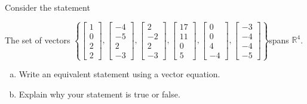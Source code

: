 
\begin{exerciseStatement}


Consider the statement 
\begin{center}\begin{minipage}{0.8\textwidth}
 The set of vectors \( \left\{ \left[\begin{array}{c}
1 \\
0 \\
2 \\
2
\end{array}\right] , \left[\begin{array}{c}
-4 \\
-5 \\
2 \\
-3
\end{array}\right] , \left[\begin{array}{c}
2 \\
-2 \\
2 \\
-3
\end{array}\right] , \left[\begin{array}{c}
17 \\
11 \\
0 \\
5
\end{array}\right] , \left[\begin{array}{c}
0 \\
0 \\
4 \\
-4
\end{array}\right] , \left[\begin{array}{c}
-3 \\
-4 \\
-4 \\
-5
\end{array}\right] \right\} \)spans \(\mathbb{R}^4\). 
\end{minipage}\end{center}
    


\begin{enumerate}[(a)]
\item  Write an equivalent statement using a vector equation.
\item  Explain why your statement is true or false.
\end{enumerate}
    
\end{exerciseStatement}
    
